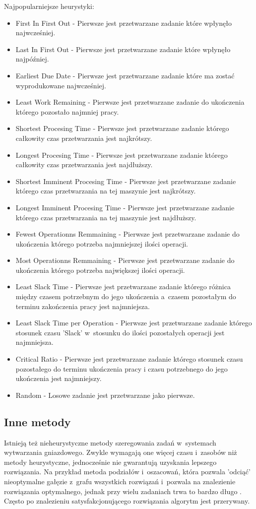 \documentclass[twoside]{kInzynierka}
\begin{document}
Najpopularniejsze heurystyki\cite{jobSlack}:
\begin{itemize}
\item First In First Out - Pierwsze jest przetwarzane zadanie które wpłynęło najwcześniej.
\item Last In First Out - Pierwsze jest przetwarzane zadanie które wpłynęło najpóźniej.
\item Earliest Due Date - Pierwsze jest przetwarzane zadanie które ma zostać wyprodukowane najwcześniej.
\item Least Work Remaining - Pierwsze jest przetwarzane zadanie do ukończenia którego pozostało najmniej pracy.
\item Shortest Procesing Time - Pierwsze jest przetwarzane zadanie którego całkowity czas przetwarzania jest najkrótszy.
\item Longest Procesing Time - Pierwsze jest przetwarzane zadanie którego całkowity czas przetwarzania jest najdłuższy.
\item Shortest Imminent Procesing Time - Pierwsze jest przetwarzane zadanie którego czas przetwarzania na tej maszynie jest najkrótszy.
\item Longest Imminent Procesing Time - Pierwsze jest przetwarzane zadanie którego czas przetwarzania na tej maszynie jest najdłuższy.
\item Fewest Operationns Remmaining - Pierwsze jest przetwarzane zadanie do ukończenia którego potrzeba najmniejszej ilości operacji.
\item Most Operationns Remmaining - Pierwsze jest przetwarzane zadanie do ukończenia którego potrzeba największej ilości operacji.
\item Least Slack Time - Pierwsze jest przetwarzane zadanie którego różnica między czasem potrzebnym do jego ukończenia a~czasem pozostałym do terminu zakończenia pracy jest najmniejsza.
\item Least Slack Time per Operation - Pierwsze jest przetwarzane zadanie którego stosunek czasu 'Slack' w~stosunku do ilości pozostałych operacji jest najmniejsza.
\item Critical Ratio - Pierwsze jest przetwarzane zadanie którego stosunek czasu pozostałego do terminu ukończenia pracy i czasu potrzebnego do jego ukończenia jest najmniejszy.
\item Random - Losowe zadanie jest przetwarzane jako pierwsze.
\end{itemize}

\subsection     {Inne metody}
Istnieją też nieheurystyczne metody szeregowania zadań w~systemach wytwarzania gniazdowego. Zwykle wymagają one więcej czasu i~zasobów niż metody heurystyczne, jednocześnie nie gwarantują uzyskania lepszego rozwiązania. Na przykład metoda podziałów i~oszacowań, która pozwala 'odciąć' nieoptymalne gałęzie z~grafu wszystkich rozwiązań i~pozwala na znalezienie rozwiązania optymalnego, jednak przy wielu zadaniach trwa to bardzo długo \cite{lagrange}. Często po znalezieniu satysfakcjonującego rozwiązania algorytm jest przerywany.
\end{document}
